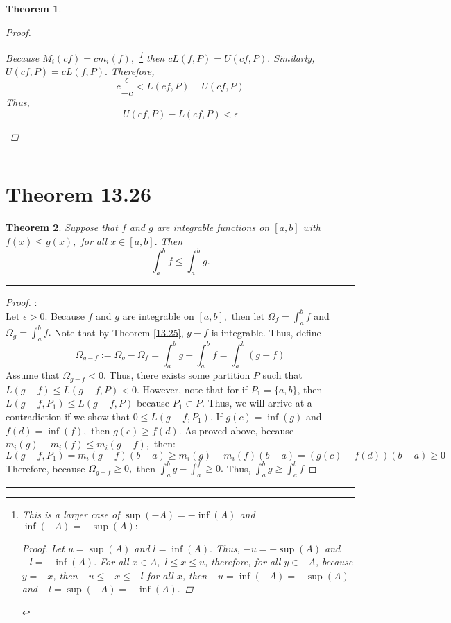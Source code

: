 \documentclass[openany, amssymb, psamsfonts]{amsart}
\newtheorem{thm}{Theorem}[section]
\theoremstyle{definition}
\numberwithin{equation}{section}
\begin{document}
\begin{thm}
\begin{enumerate}[(a)]
\begin{proof}
\begin{enumerate}
        Because $M_i(cf) = cm_i(f),$ \footnote{This is a larger case of $\sup(-A) = -\inf(A)$ and $\inf(-A) = -\sup(A):$ \begin{proof}
            Let $u = \sup(A)$ and $l = \inf(A).$ Thus, $-u = -\sup(A)$ and $-l = -\inf(A).$ For all $x \in A,$ $l\leq x\leq u$, therefore, for all $y \in -A$, because $y = -x$, then $-u\leq -x\leq -l$ for all $x$, then $-u = \inf(-A) = -\sup(A)$ and $-l = \sup(-A) = -\inf(A).$ 
        \end{proof}} 
        then $cL(f,P) = U(cf,P).$ Similarly, $U(cf,P) = cL(f,P).$ Therefore, \[c\frac{\epsilon}{-c}<L(cf,P) - U(cf,P)\]
        Thus, \[U(cf,P) - L(cf,P)< \epsilon\]
    \end{enumerate}
\end{proof}\vspace{4pt}     \hrule   \vspace{4pt} 
	\end{enumerate}
\end{thm}

\section*{Theorem 13.26}
\begin{thm}
\label{13.26}
Suppose that $f$ and $g$ are integrable functions on $[a, b]$ with $f(x)\leq g(x),$ for all $x\in [a,b].$ Then
$$\int_a^b f\leq \int_a^b g.$$
\end{thm}
\vspace{4pt}     \hrule   \vspace{4pt}\begin{proof}:\\
Let $\epsilon>0.$ Because $f$ and $g$ are integrable on $[a,b],$ then let $\Omega_f = \int_a^bf$ and $\Omega_g = \int_a^bf.$ Note that by Theorem \ref{13.25}, $g-f$ is integrable. Thus, define \[\Omega_{g-f}:= \Omega_g - \Omega_f = \int_a^bg - \int_a^b f = \int_a^b(g - f)\]
Assume that $\Omega_{g-f}<0.$ Thus, there exists some partition $P$ such that $L(g-f)\leq L(g-f,P)< 0$. However, note that for if $P_1 = \{a,b\}$, then $L(g-f, P_1) \leq L(g-f,P)$ because $P_1 \subset P.$ Thus, we will arrive at a contradiction if we show that $0\leq L(g-f,P_1)$.\newline\newline
If $g(c) = \inf(g)$ and $f(d) = \inf(f),$ then $g(c)\geq f(d).$ As proved above, because $m_i(g) - m_i(f)\leq m_i(g-f),$ then:
\[L(g-f,P_1) = m_i(g-f)(b-a)\geq m_i(g) - m_i(f)(b-a) = (g(c) - f(d))(b-a)\geq 0\]
Therefore, because $\Omega_{g-f}\geq 0,$ then $\int_a^bg - \int_a^f\geq 0.$ Thus, $\int_a^bg \geq \int_a^bf$
\end{proof}\vspace{4pt}     \hrule   \vspace{4pt}
\end{document}
